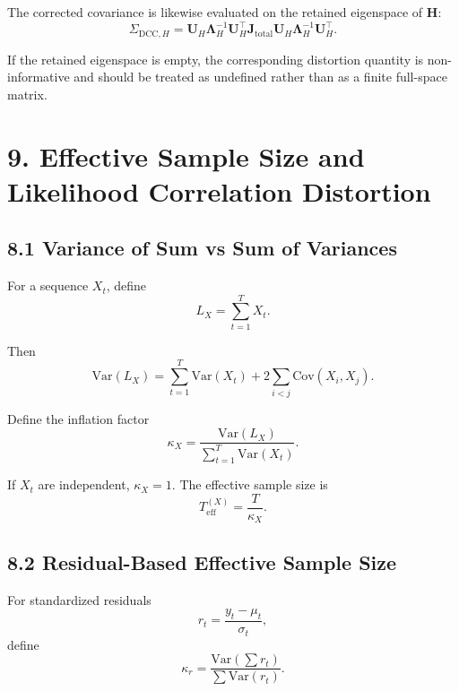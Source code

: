 \documentclass[11pt]{article}
\begin{document}
The corrected covariance is likewise evaluated on the retained eigenspace of $\mathbf H$:
\begin{equation}
\Sigma_{\mathrm{DCC},H}
=
\mathbf U_H
\mathbf \Lambda_H^{-1}
\mathbf U_H^\top
\mathbf J_{\mathrm{total}}
\mathbf U_H
\mathbf \Lambda_H^{-1}
\mathbf U_H^\top.
\end{equation}

If the retained eigenspace is empty, the corresponding distortion quantity is non-informative and should be treated as undefined rather than as a finite full-space matrix.

\section*{9. Effective Sample Size and Likelihood Correlation Distortion}

\subsection*{8.1 Variance of Sum vs Sum of Variances}

For a sequence $X_t$, define
\begin{equation}
L_X = \sum_{t=1}^T X_t.
\end{equation}

Then
\begin{equation}
\mathrm{Var}(L_X)
=
\sum_{t=1}^T \mathrm{Var}(X_t)
+
2\sum_{i<j}\mathrm{Cov}(X_i, X_j).
\end{equation}

Define the inflation factor
\begin{equation}
\kappa_X
=
\frac{\mathrm{Var}(L_X)}
{\sum_{t=1}^T \mathrm{Var}(X_t)}.
\end{equation}

If $X_t$ are independent, $\kappa_X = 1$. The effective sample size is
\begin{equation}
T_{\mathrm{eff}}^{(X)} = \frac{T}{\kappa_X}.
\end{equation}

\subsection*{8.2 Residual-Based Effective Sample Size}

For standardized residuals
\begin{equation}
r_t = \frac{y_t - \mu_t}{\sigma_t},
\end{equation}
define
\begin{equation}
\kappa_r
=
\frac{\mathrm{Var}\!\left(\sum r_t\right)}
{\sum \mathrm{Var}(r_t)}.
\end{equation}
\end{document}
